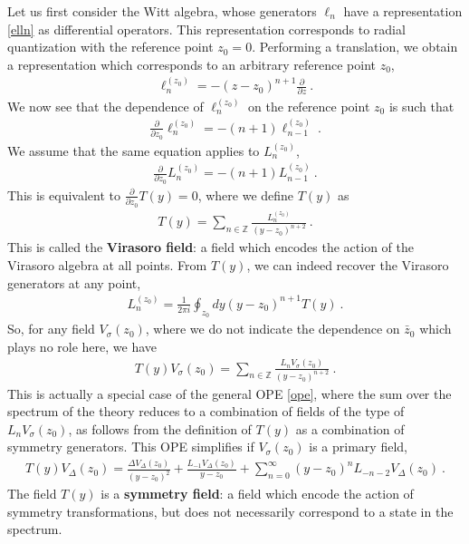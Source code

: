 \documentclass[12pt,a4paper,notitlepage]{report}
\numberwithin{equation}{section}
\theoremstyle{break}
\begin{document}
Let us first consider the Witt algebra, whose generators $\ell_n$
have a representation \eqref{elln} as differential operators.
This representation corresponds to radial quantization with the reference point $z_0=0$.
Performing a translation, we obtain
a representation which corresponds to an arbitrary reference point $z_0$, 
\begin{align}
 \ell_n^{(z_0)} = -(z-z_0)^{n+1}{\frac{\partial}{\partial z}}\ .
\label{lzz}
\end{align}
We now see that the dependence of $\ell_n^{(z_0)}$ on the reference point $z_0$ is such that
\begin{align}
 {\frac{\partial}{\partial z_0}} \ell_{n}^{(z_0)} = -(n+1) \ell_{n-1}^{(z_0)}\ .
\end{align}
We assume that the same equation applies to $L_n^{(z_0)}$, 
\begin{align}
 {\frac{\partial}{\partial z_0}} L_{n}^{(z_0)} = -(n+1) L_{n-1}^{(z_0)}\ .
\label{pll}
\end{align}
This is equivalent to $\frac{\partial}{\partial z_0} T(y) = 0$, where we define $T(y)$ as 
\begin{align}
 \boxed{T(y) = \sum_{n\in{\mathbb{Z}}} \frac{L_n^{(z_0)}}{(y-z_0)^{n+2}}}\ .
\label{tsl}
\end{align}
This is called the \textbf{\boldmath Virasoro field}: a field which encodes the action of the Virasoro algebra at all points. 
From $T(y)$, we can indeed recover the Virasoro generators at any point,
\begin{align}
\boxed{ L_n^{(z_0)} = \frac{1}{2\pi i}\oint_{z_0} dy (y-z_0)^{n+1} T(y)} \ .
\label{lit}
\end{align}
So, for any field $V_\sigma(z_0)$, where we do not indicate the dependence on $\bar{z}_0$ which plays no role here, we have
\begin{align}
 \boxed{T(y)V_\sigma(z_0) = \sum_{n\in{\mathbb{Z}}} \frac{L_n V_\sigma(z_0)}{(y-z_0)^{n+2}}}\ .
\label{tv}
\end{align}
This is actually a special case of the general OPE \eqref{ope}, where the sum over the spectrum of the theory reduces to a combination of fields of the type of $L_n V_\sigma(z_0)$, as follows from the definition of $T(y)$ as a combination of symmetry generators.
This OPE simplifies if $V_\sigma(z_0)$ is a primary field, 
\begin{align}
 T(y) V_\Delta(z_0) = \frac{\Delta V_\Delta(z_0)}{(y-z_0)^2} + \frac{L_{-1} V_\Delta(z_0)}{y-z_0} + \sum_{n=0}^\infty (y-z_0)^n L_{-n-2}V_\Delta(z_0)\ .
\label{tvp}
\end{align}
The field $T(y)$ is a \textbf{\boldmath symmetry field}: a field which encode the action of symmetry transformations, but does not necessarily correspond to a state in the spectrum. 
\end{document}
